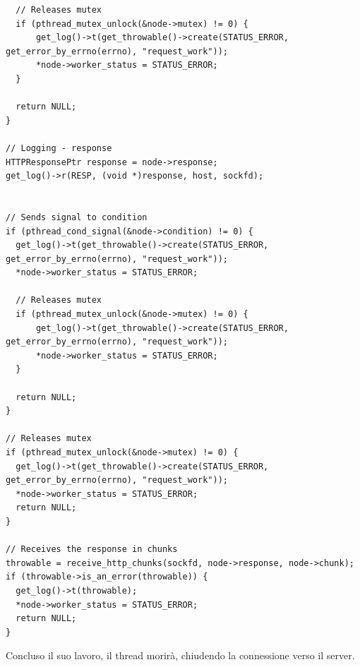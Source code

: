 \documentclass[italian]{tktltiki2}
\begin{document}
\begin{lstlisting}
  // Releases mutex
  if (pthread_mutex_unlock(&node->mutex) != 0) {
      get_log()->t(get_throwable()->create(STATUS_ERROR, get_error_by_errno(errno), "request_work"));
      *node->worker_status = STATUS_ERROR;
  }

  return NULL;
}

// Logging - response
HTTPResponsePtr response = node->response;
get_log()->r(RESP, (void *)response, host, sockfd);


// Sends signal to condition
if (pthread_cond_signal(&node->condition) != 0) {
  get_log()->t(get_throwable()->create(STATUS_ERROR, get_error_by_errno(errno), "request_work"));
  *node->worker_status = STATUS_ERROR;
  
  // Releases mutex
  if (pthread_mutex_unlock(&node->mutex) != 0) {
      get_log()->t(get_throwable()->create(STATUS_ERROR, get_error_by_errno(errno), "request_work"));
      *node->worker_status = STATUS_ERROR;
  }

  return NULL;
}

// Releases mutex
if (pthread_mutex_unlock(&node->mutex) != 0) {
  get_log()->t(get_throwable()->create(STATUS_ERROR, get_error_by_errno(errno), "request_work"));
  *node->worker_status = STATUS_ERROR;
  return NULL;
}

// Receives the response in chunks
throwable = receive_http_chunks(sockfd, node->response, node->chunk);
if (throwable->is_an_error(throwable)) {
  get_log()->t(throwable);
  *node->worker_status = STATUS_ERROR;
  return NULL;
}
\end{lstlisting}
Concluso il suo lavoro, il thread morirà, chiudendo la connessione verso il server.
\end{document}
